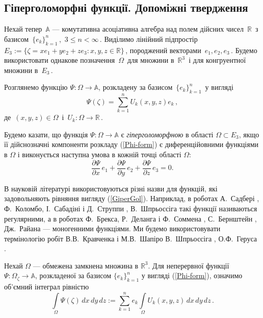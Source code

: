 \documentclass[11pt, reqno]{amsart}
\begin{document}
\vskip 2mm



\subsection{Гіперголоморфні функції. Допоміжні твердження}


Нехай тепер\, $\mathbb{A}$ --- комутативна асоціативна алгебра над полем дійсних чисел\, $\mathbb{R}$\, з базисом\,
$\{e_{k}\}_{k=1}^{n}$\,,\, $3\leq n<\infty$\,.
Виділимо лінійний підпростір\,
$E_{3}:=\{\zeta=xe_1+ye_{2}+ze_{3}: x, y, z\in\mathbb{R}\}$\,,
породжений векторами\, $e_1,e_2,e_3$\,. Будемо використовати однакове позначення\, $\Omega$\, 
для множини в\, ${\mathbb R}^3$\,  і для конгруентної множини в\, $E_3$\,.

Розглянемо функцію $\Psi:\Omega\rightarrow\mathbb{A}$, розкладену за базисом\, $\{e_{k}\}_{k=1}^{n}$\, у вигляді
\begin{equation}\label{Phi-form}
\Psi(\zeta)=\sum\limits_{k=1}^{n}U_{k}(x,y,z)e_{k}\,,
\end{equation}
де\, $(x,y,z)\in\Omega$\, і\, $U_k :
\Omega\rightarrow\mathbb{R}$\,.

Будемо казати, що функція $\Psi: \Omega\rightarrow\mathbb{A}$
є \textit{гіперголоморфною}\/ в області $\Omega\subset E_3$, якщо
її дійснозначні компоненти розкладу (\ref{Phi-form}) є
диференційовними функціями в $\Omega$ і виконується
наступна умова в кожній точці області $\Omega$:
\begin{equation}\label{GiperGol}
\frac{\partial\Psi}{\partial x}\,e_1+\frac{\partial\Psi}{\partial
y}\,e_{2}+\frac{\partial\Psi}{\partial z}\,e_{3}=0.
\end{equation}




В науковій літературі використовуються різні назви для функцій, які
задовольняють рівняння вигляду (\ref{GiperGol}). Наприклад, в
роботах А.~Садбері \cite{Sudbery}, Ф.~Коломбо, І.~Сабадіні і Д.~Струппи \cite{Colombo},
В.~Шпрьоссіга \cite{Spr} такі функції називаються
регулярними, а в роботах Ф.~Брекса, Р.~Деланга і Ф.~Соммена \cite{Brakx}, С.~Бернштейн \cite{Bernstein},
Дж.~Райана \cite{Ryan} --- моногенними функціями. 
Ми будемо використовувати термінологію робіт В.В.~Кравченка і М.В.~Шапіро \cite{Krav-Shap}
В.~Шпрьоссіга \cite{Spros}, О.Ф.~Геруса \cite{Gerus-2011}.



Нехай $\Omega$ --- обмежена замкнена множина в $\mathbb{R}^{3}$. Для
неперервної функції $\Psi:\Omega_{\zeta}\rightarrow\mathbb{A}$, розкладеної за базисом $\{e_{k}\}_{k=1}^{n}$
у вигляді (\ref{Phi-form}), означимо об'ємний інтеграл рівністю
$$\int\limits_{\Omega}\Psi(\zeta)\,dx\,dy\,dz:=\sum\limits_{k=1}^{n}
e_{k}\int\limits_{\Omega}U_{k}(x,y,z)\,dx\,dy\,dz\,.$$
\end{document}

